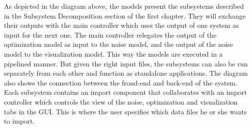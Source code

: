 As depicted in the diagram above, the models present the subsystems described in the Subsystem Decomposition section of the first chapter. They will exchange their outputs with the main controller which uses the output of one system as input for the next one. The main controller relegates the output of the optimization model as input to the noise model, and the output of the noise model to the visualization model. This way the models are executed in a pipelined manner. But given the right input files, the subsystems can also be run separately from each other and function as standalone applications.
The diagram also shows the connection between the frond-end and back-end of the system. Each subsystem contains an import component that collaborates with an import controller which controls the view of the noise, optimization and visualization tabs in the GUI. This is where the user specifies which data files he or she wants to import. 
